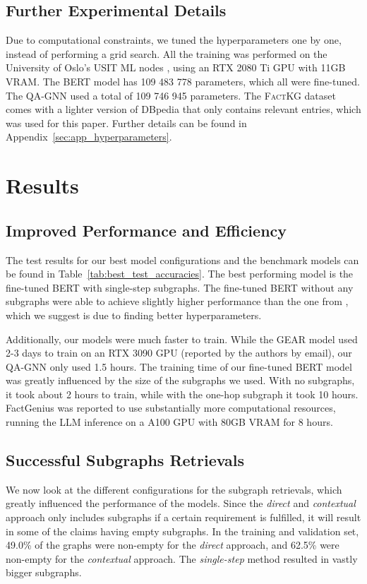 \documentclass[11pt]{article}
\begin{document}
\subsection{Further Experimental Details}

Due to computational constraints, we tuned the hyperparameters one by one, instead of performing a grid search. All the training was performed on the University of Oslo's USIT ML nodes \citep{2023uio_mlnodes}, using an RTX 2080 Ti GPU with 11GB VRAM. The BERT model has 109 483 778 parameters, which all were fine-tuned. The QA-GNN used a total of 109 746 945 parameters. The \textsc{FactKG} dataset comes with a lighter version of DBpedia that only contains relevant entries, which was used for this paper. Further details can be found in Appendix~\ref{sec:app_hyperparameters}.

\section{Results}

\subsection{Improved Performance and Efficiency}

The test results for our best model configurations and the benchmark models can be found in Table~\ref{tab:best_test_accuracies}. The best performing model is the fine-tuned BERT with single-step subgraphs. The fine-tuned BERT without any subgraphs were able to achieve slightly higher performance than the one from \citet{kim2023factkg}, which we suggest is due to finding better hyperparameters.

Additionally, our models were much faster to train. While the GEAR model used 2-3 days to train on an RTX 3090 GPU (reported by the authors by email), our QA-GNN only used 1.5 hours. The training time of our fine-tuned BERT model was greatly influenced by the size of the subgraphs we used. With no subgraphs, it took about 2 hours to train, while with the one-hop subgraph it took 10 hours. FactGenius was reported to use substantially more computational resources, running the LLM inference on a A100 GPU with 80GB VRAM for 8 hours.

\subsection{Successful Subgraphs Retrievals}

We now look at the different configurations for the subgraph retrievals, which greatly influenced the performance of the models. Since the \emph{direct} and \emph{contextual} approach only includes subgraphs if a certain requirement is fulfilled, it will result in some of the claims having empty subgraphs. In the training and validation set, 49.0\% of the graphs were non-empty for the \emph{direct} approach, and 62.5\% were non-empty for the \emph{contextual} approach. The \emph{single-step} method resulted in vastly bigger subgraphs.
\end{document}
